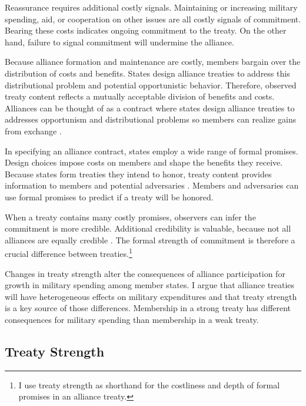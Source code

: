 \documentclass[12pt]{article}
\begin{document}
Reassurance requires additional costly signals. 
Maintaining or increasing military spending, aid, or cooperation on other issues are all costly signals of commitment. 
Bearing these costs indicates ongoing commitment to the treaty. 
On the other hand, failure to signal commitment will undermine the alliance. 


Because alliance formation and maintenance are costly, members bargain over the distribution of costs and benefits.
States design alliance treaties to address this distributional problem and potential opportunistic behavior. 
Therefore, observed treaty content reflects a mutually acceptable division of benefits and costs. 
Alliances can be thought of as a contract where states design alliance treaties to addresses opportunism and distributional problems \citep{Williamson1985, Koremenosetal2001} so members can realize gains from exchange \citep{Lake1996, Bensonetal2014}.


In specifying an alliance contract, states employ a wide range of formal promises. 
Design choices impose costs on members and shape the benefits they receive.
Because states form treaties they intend to honor, treaty content provides information to members and potential adversaries \citep{Leeds2003}. 
Members and adversaries can use formal promises to predict if a treaty will be honored.


When a treaty contains many costly promises, observers can infer the commitment is more credible. 
Additional credibility is valuable, because not all alliances are equally credible \citep{Benson2012}. 
The formal strength of commitment is therefore a crucial difference between treaties.\footnote{I use treaty strength as shorthand for the costliness and depth of formal promises in an alliance treaty.} 


Changes in treaty strength alter the consequences of alliance participation for growth in military spending among member states. 
I argue that alliance treaties will have heterogeneous effects on military expenditures and that treaty strength is a key source of those differences. 
Membership in a strong treaty has different consequences for military spending than membership in a weak treaty. 


\subsection{Treaty Strength}
\end{document}
